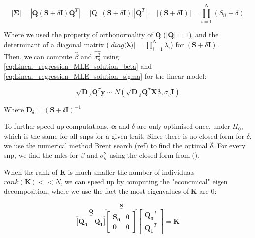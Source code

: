 \begin{equation}\label{eq:fast_lmm_Sigma_determinant}
    |\boldsymbol{\Sigma}| = |\mathbf{Q} (\mathbf{S} + \delta\mathbf{I})\mathbf{Q}^T|= |\mathbf{Q}||(\mathbf{S} + \delta\mathbf{I})||\mathbf{Q}^T| = |(\mathbf{S} + \delta\mathbf{I})| =  \prod_{i=1}^{N} (S_{ii} + \delta)
\end{equation}

Where we used the property of orthonormality of $\mathbf{Q}$ ($|\mathbf{Q}| = 1$), and the determinant of a diagonal matrix ($|diag(\boldsymbol{\lambda)}| = \prod_{i=1}^{N} \lambda_i$) for $(\mathbf{S} + \delta\mathbf{I})$.\\

Then, we can compute $\hat{\beta}$ and  $\hat{\sigma_g^2}$ using \eqref{eq:Linear_regression_MLE_solution_beta} and \eqref{eq:Linear_regression_MLE_solution_sigma} for the linear model:

\begin{equation}
    \sqrt{\mathbf{D}}_{\delta}\mathbf{Q}^{T}\mathbf{y} \sim N(\sqrt{\mathbf{D}}_{\delta}\mathbf{Q}^{T}\mathbf{X}\boldsymbol{\beta}, \sigma_g\mathbf{I})
\end{equation}

Where $ \mathbf{D}_{\delta} = (\mathbf{S} + \delta\mathbf{I})^{-1}$

To further speed up computations, $\boldsymbol{\alpha}$ and $\delta$ are only optimised once, under $H_0$, which is the same for all \gls{snps} for a given trait.
Since there is no closed form for $\delta$, we use the numerical method Brent search (ref) to find the optimal $\hat{\delta}$.
For every snp, we find the \gls{mle}s for $\beta$ and $\sigma^2_g$ using the closed form from ().

When the rank of $\mathbf{K}$ is much smaller the number of individuals $rank(\mathbf{K}) << N$,  we can speed up by computing the "economical" eigen decomposition, where we use the fact the most eigenvalues of $\mathbf{K}$ are 0:

\begin{equation}\label{eq:economic_eigen_decomposition}
    \overbrace{[\mathbf{Q_0} \quad \mathbf{Q_1]}}^{\mathbf{Q}}
            \overbrace{\left[\begin{array}{cc}
                \mathbf{S_0} & \mathbf{0}\\
                        \mathbf{0} & \mathbf{0}
            \end{array}\right]}^{\mathbf{S}}
        \left[\begin{array}{c}
            \mathbf{Q_0}^T \\
            \mathbf{Q_1}^T
        \end{array}\right] = \mathbf{K}
\end{equation}

